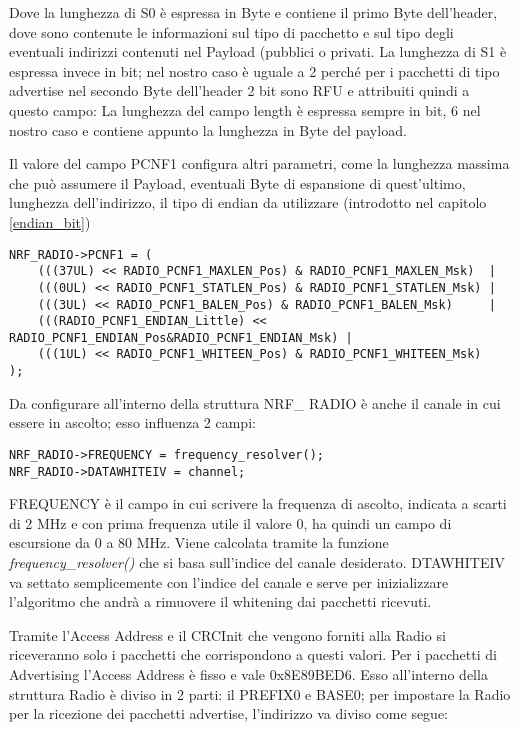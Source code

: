 Dove la lunghezza di S0 è espressa in Byte e contiene il primo Byte dell'header, dove sono contenute le informazioni sul tipo di pacchetto e sul tipo degli eventuali indirizzi contenuti nel Payload (pubblici o privati.
La lunghezza di S1 è espressa invece in bit; nel nostro caso è uguale a 2 perché per i pacchetti di tipo advertise nel secondo Byte dell'header 2 bit sono RFU e attribuiti quindi a questo campo:
La lunghezza del campo length è espressa sempre in bit, 6 nel nostro caso e contiene appunto la lunghezza in Byte del payload.

Il valore del campo PCNF1 configura altri parametri, come la lunghezza massima che può assumere il Payload, eventuali Byte di espansione di quest'ultimo, lunghezza dell'indirizzo, il tipo di endian da utilizzare (introdotto nel capitolo \ref{endian_bit}) 

\begin{verbatim}
NRF_RADIO->PCNF1 = (
	(((37UL) << RADIO_PCNF1_MAXLEN_Pos) & RADIO_PCNF1_MAXLEN_Msk)  |                     
	(((0UL) << RADIO_PCNF1_STATLEN_Pos) & RADIO_PCNF1_STATLEN_Msk) |                     
	(((3UL) << RADIO_PCNF1_BALEN_Pos) & RADIO_PCNF1_BALEN_Msk)     |                     
	(((RADIO_PCNF1_ENDIAN_Little) << RADIO_PCNF1_ENDIAN_Pos&RADIO_PCNF1_ENDIAN_Msk) | 
	(((1UL) << RADIO_PCNF1_WHITEEN_Pos) & RADIO_PCNF1_WHITEEN_Msk)                        
);
\end{verbatim}

Da configurare all'interno della struttura NRF\_ RADIO è anche il canale in cui essere in ascolto; esso influenza 2 campi:
\begin{verbatim}
NRF_RADIO->FREQUENCY = frequency_resolver(); 
NRF_RADIO->DATAWHITEIV = channel;
\end{verbatim}

FREQUENCY è il campo in cui scrivere la frequenza di ascolto, indicata a scarti di 2 MHz e con prima frequenza utile il valore 0, ha quindi un campo di escursione da 0 a 80 MHz. Viene calcolata tramite la funzione \emph{frequency\_resolver()} che si basa sull'indice del canale desiderato.
DTAWHITEIV va settato semplicemente con l'indice del canale e serve per inizializzare l'algoritmo che andrà a rimuovere il whitening dai pacchetti ricevuti.

Tramite l'Access Address e il CRCInit che vengono forniti alla Radio si riceveranno solo i pacchetti che corrispondono a questi valori. Per i pacchetti di Advertising l'Access Address è fisso e vale 0x8E89BED6. Esso all'interno della struttura Radio è diviso in 2 parti: il PREFIX0 e BASE0; per impostare la Radio per la ricezione dei pacchetti advertise, l'indirizzo va diviso come segue:

